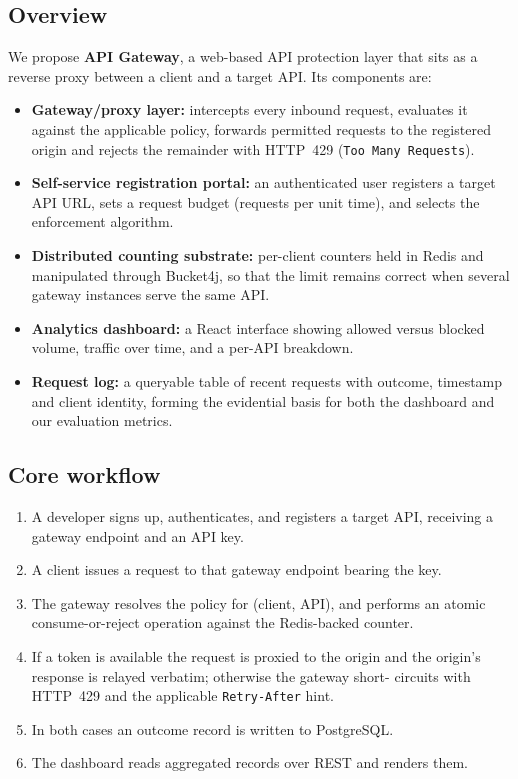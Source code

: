 \documentclass[11pt,a4paper]{article}
\begin{document}
\subsection{Overview}
We propose \textbf{API Gateway}, a web-based API protection layer that sits as a
reverse proxy between a client and a target API. Its components are:
\begin{itemize}[leftmargin=0.7cm]
    \item \textbf{Gateway/proxy layer:} intercepts every inbound request,
      evaluates it against the applicable policy, forwards permitted requests
      to the registered origin and rejects the remainder with HTTP~429
      (\texttt{Too Many Requests}).
    \item \textbf{Self-service registration portal:} an authenticated user
      registers a target API URL, sets a request budget (requests per unit
      time), and selects the enforcement algorithm.
    \item \textbf{Distributed counting substrate:} per-client counters held in
      Redis and manipulated through Bucket4j, so that the limit remains
      correct when several gateway instances serve the same API.
    \item \textbf{Analytics dashboard:} a React interface showing allowed
      versus blocked volume, traffic over time, and a per-API breakdown.
    \item \textbf{Request log:} a queryable table of recent requests with
      outcome, timestamp and client identity, forming the evidential basis for
      both the dashboard and our evaluation metrics.
\end{itemize}

\subsection{Core workflow}
\begin{enumerate}[leftmargin=0.7cm]
    \item A developer signs up, authenticates, and registers a target API,
      receiving a gateway endpoint and an API key.
    \item A client issues a request to that gateway endpoint bearing the key.
    \item The gateway resolves the policy for (client, API), and performs an
      atomic consume-or-reject operation against the Redis-backed counter.
    \item If a token is available the request is proxied to the origin and the
      origin's response is relayed verbatim; otherwise the gateway short-
      circuits with HTTP~429 and the applicable \texttt{Retry-After} hint.
    \item In both cases an outcome record is written to PostgreSQL.
    \item The dashboard reads aggregated records over REST and renders them.
\end{enumerate}
\end{document}
